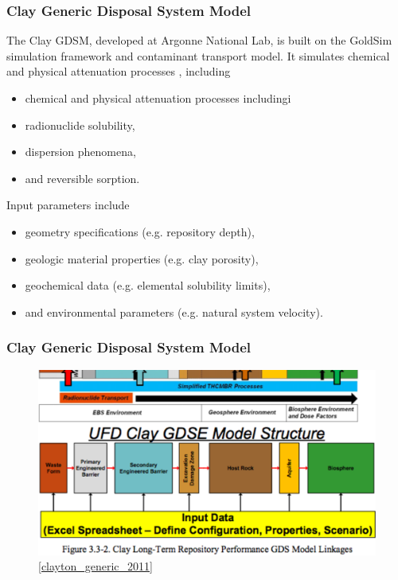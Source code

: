 \begin{frame}[c]
  \frametitle{Clay Generic Disposal System Model}
The Clay \gls{GDSM}, developed at Argonne National Lab, is built on the GoldSim simulation framework and contaminant transport model.  
It simulates chemical and physical attenuation processes \cite{golder_goldsim_2010, golder_goldsim_ct_2010}, including 
\begin{itemize}
  \item  chemical and physical attenuation processes includingi
  \item radionuclide solubility,
  \item dispersion phenomena,
  \item and reversible sorption.
\end{itemize}

Input parameters include 
\begin{itemize}
  \item geometry specifications (e.g. repository depth),
  \item geologic material properties (e.g. clay porosity), 
  \item geochemical data (e.g. elemental solubility limits),
  \item and environmental parameters (e.g. natural system velocity). 
\end{itemize}
\end{frame}

\begin{frame}[c]
  \frametitle{Clay Generic Disposal System Model}
\begin{figure}[htb!]
\begin{center}
\includegraphics[height=0.7\textheight]{feps.eps}
\end{center}
\caption{\ref{clayton_generic_2011}}
\label{fig:feps}
\end{figure}
\end{frame}


